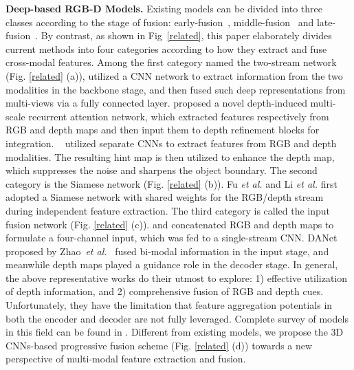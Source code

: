 \documentclass[letterpaper]{article}
\begin{document}
\noindent \textbf{Deep-based RGB-D Models.} Existing models can be divided into three classes according to the stage of fusion: early-fusion~\cite{peng2014rgbd,song2017depth}, middle-fusion~\cite{feng2016local,fu2020jl,fu2020siamese,zhang2020uc,piao2019depth} and late-fusion~\cite{fan2014salient}. By contrast, as shown in Fig~\ref{related}, this paper elaborately divides current methods into four categories according to how they extract and fuse cross-modal features. Among the first category named the two-stream network (Fig. \ref{related} (a)), \cite{han2017cnns} utilized a CNN network to extract information from the two modalities in the backbone stage, and then fused such deep representations from multi-views via a fully connected layer. \cite{piao2019depth} proposed a novel depth-induced multi-scale recurrent attention network, which extracted features respectively from RGB and depth maps and then input them to depth refinement blocks for integration. ~\cite{chen2020ef} utilized separate CNNs to extract features from RGB and depth modalities. The resulting hint map is then utilized to enhance the depth map, which suppresses the noise and sharpens the object boundary. The second category is the Siamese network (Fig. \ref{related} (b)). Fu \textit{et al.} \cite{fu2020jl} and Li \textit{et al.} \cite{li2020icnet} first adopted a Siamese network with shared weights for the RGB/depth stream during independent feature extraction. The third category is called the input fusion network (Fig. \ref{related} (c)). \cite{huang2018rgbd} and \cite{liu2019salient} concatenated RGB and depth maps to formulate a four-channel input, which was fed to a single-stream CNN. DANet proposed by Zhao~\textit{et al.}~\cite{zhao2020single} fused bi-modal information in the input stage, and meanwhile depth maps played a guidance role in the decoder stage. In general, the above representative works do their utmost to explore: 1) effective utilization of depth information, and 2) comprehensive fusion of RGB and depth cues. Unfortunately, they have the limitation that feature aggregation potentials in both the encoder and decoder are not fully leveraged. Complete survey of models in this field can be found in \cite{zhou2020rgbd}. Different from existing models, we propose the 3D CNNs-based progressive fusion scheme (Fig. \ref{related} (d)) towards a new perspective of multi-modal feature extraction and fusion.
\end{document}
